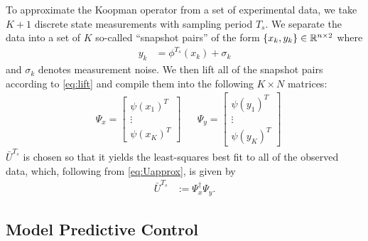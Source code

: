 To approximate the Koopman operator from a set of experimental data, we take $K+1$ discrete state measurements with sampling period $T_s$. We separate the data into a set of $K$ so-called ``snapshot pairs'' of the form ${ \{ x_k , y_k \} \in \mathbb{R}^{n \times 2} }$ where
\begin{align}
    y_{k} &= \phi^{T_s} (x_k) + \sigma_k
\end{align}
and $\sigma_k$ denotes measurement noise.
We then lift all of the snapshot pairs according to \eqref{eq:lift} and compile them into the following ${K \times N}$ matrices:
\begin{align}
    &\Psi_x = \begin{bmatrix} {\psi}(x_1)^T \\ \vdots \\  {\psi}(x_K)^T \end{bmatrix}
    &&\Psi_y = \begin{bmatrix} {\psi}(y_1)^T \\ \vdots \\  {\psi}(y_K)^T \end{bmatrix}
\end{align}
$\bar{U}^{T_s}$ is chosen so that it yields the least-squares best fit to all of the observed data, which, following from \eqref{eq:Uapprox}, is given by 
\begin{align}
    \bar{U}^{T_s} &:= \Psi_x^\dagger \Psi_y.
\end{align}

\subsection{Model Predictive Control}